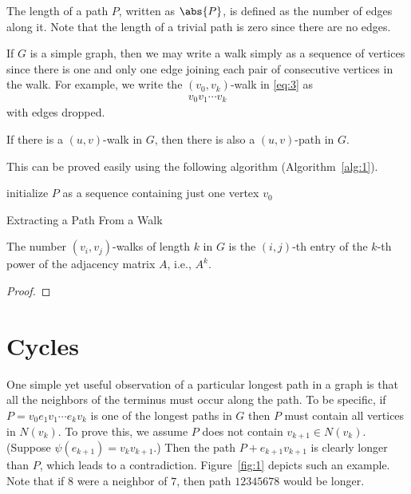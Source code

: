 \documentclass[thmcnt=section, 12pt, color=cyan]{my-elegantbook}
\begin{document}
The length of a path $P$, written as $\abs{P}$, is defined as the number of edges along it. Note that the length of a trivial path is zero since there are no edges.

If $G$ is a simple graph, then we may write a walk simply as a sequence of vertices since there is one and only one edge joining each pair of consecutive vertices in the walk. For example, we write the $(v_0, v_k)$-walk in \eqref{eq:3} as 
\begin{align*}
    v_0 v_1 \cdots v_k
\end{align*}
with edges dropped.


\begin{proposition}
    If there is a $(u, v)$-walk in $G$, then there is also a $(u, v)$-path in $G$.
\end{proposition}

This can be proved easily using the following algorithm (Algorithm~\ref{alg:1}).

\begin{algorithm}[ht]
    initialize $P$ as a sequence containing just one vertex $v_0$ \;
    \caption{Extracting a Path From a Walk}
    \label{alg:1}
\end{algorithm}


\begin{proposition}
    The number $(v_i, v_j)$-walks of length $k$ in $G$ is the $(i,j)$-th entry of the $k$-th power of the adjacency matrix $A$, i.e., $A^k$.
\end{proposition}

\begin{proof}
\end{proof}


\section{Cycles}


One simple yet useful observation of a particular longest path 
in a graph is that all the neighbors of the terminus must 
occur along the path. To be specific, 
if $P = v_0 e_1 v_1 \cdots e_k v_k$ is one of the longest paths in $G$ 
then $P$ must contain all vertices in $N(v_k)$. 
To prove this, we assume $P$ does not contain $v_{k+1} \in N(v_k)$. 
(Suppose $\psi(e_{k+1}) = v_k v_{k+1}$.) 
Then the path $P + e_{k+1}v_{k+1}$ is clearly longer than $P$, 
which leads to a contradiction. 
Figure~\ref{fig:1} depicts such an example. 
Note that if $8$ were a neighbor of $7$, 
then path $12345678$ would be longer.
\end{document}
